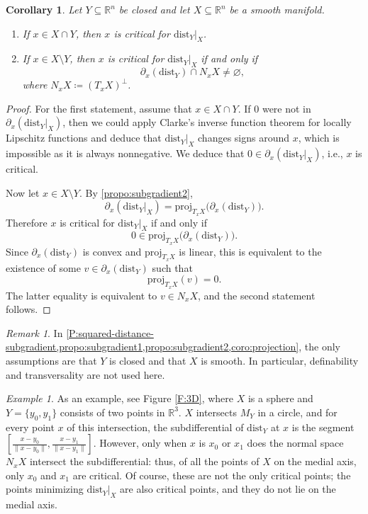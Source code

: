 \documentclass{amsart}
\newcommand{\R}{\mathbb{R}}
\newcommand{\dd}{\mathrm{dist}}
\newcommand{\dist}{{\mathrm{dist}_Y|_X}}
\newtheorem{corollary}[subsubsection]{Corollary}
\theoremstyle{definition}
\theoremstyle{remark}
\newtheorem{remark}[subsubsection]{Remark}
\newtheorem{example}[subsubsection]{Example}
\begin{document}
\begin{corollary}\label{coro:projection}
Let $Y \subseteq \R^n$ be closed and let $X \subseteq \R^n$ be a smooth manifold.
\begin{enumerate}
\item If $x \in X \cap Y$, then $x$ is critical for $\dist$.
\item If $x \in X \setminus Y$, then $x$ is critical for $\dist$ if and only if
\[
\partial_x(\dd_Y)\cap N_xX \neq \varnothing,
\]
where $N_xX \coloneqq (T_xX)^\perp$.
\end{enumerate}
\end{corollary}

\begin{proof}
For the first statement, assume that $x \in X \cap Y$.
If $0$ were not in $\partial_x(\dist)$, then we could apply Clarke's inverse function theorem for locally Lipschitz functions \cite[Theorem 1]{clarkeIFT} and deduce that $\dist$ changes signs around $x$, which is impossible as it is always nonnegative. We deduce that $0 \in \partial_x(\dist)$, i.e., $x$ is critical.

Now let $x \in X \setminus Y$. By \cref{propo:subgradient2},
\[
\partial_x(\dist)=\mathrm{proj}_{T_xX}\bigl(\partial_x(\dd_Y)\bigr).
\]
Therefore $x$ is critical for $\dist$ if and only if
\[
0 \in \mathrm{proj}_{T_xX}\bigl(\partial_x(\dd_Y)\bigr).
\]
Since $\partial_x(\dd_Y)$ is convex and $\mathrm{proj}_{T_xX}$ is linear, this is equivalent to the existence of some $v \in \partial_x(\dd_Y)$ such that
\[
\mathrm{proj}_{T_xX}(v)=0.
\]
The latter equality is equivalent to $v \in N_xX$, and the second statement follows.
\end{proof}

\begin{remark}%
In \cref{P:squared-distance-subgradient,propo:subgradient1,propo:subgradient2,coro:projection}, the only assumptions are that $Y$ is closed and that $X$ is smooth. In particular, definability and transversality are not used here.
\end{remark}






\begin{example}
As an example, see Figure \ref{F:3D}, where $X$ is a sphere and $Y = \{y_0, y_1\}$ consists of two points in $\R^3$. $X$ intersects $M_Y$ in a circle, and for every point $x$ of this intersection, the subdifferential of $\dd_Y$ at $x$ is the segment $[\frac{x - y_0}{\|x - y_0\|}, \frac{x - y_1}{\|x - y_1\|}]$. However, only when $x$ is $x_0$ or $x_1$ does the normal space $N_x X$ intersect the subdifferential: thus, of all the points of $X$ on the medial axis, only $x_0$ and $x_1$ are critical. Of course, these are not the only critical points; the points minimizing $\dist$ are also critical points, and they do not lie on the medial axis.
\end{example}
\end{document}
